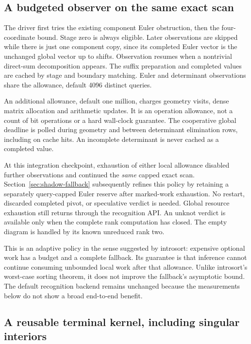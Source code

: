 \subsection{A budgeted observer on the same exact scan}

The driver first tries the existing component Euler obstruction, then
the four-coordinate bound.  Stage zero is always eligible.  Later
observations are skipped while there is just one component copy, since
its completed Euler vector is the unchanged global vector up to shifts.
Observation resumes when a nontrivial direct-sum decomposition appears.
The suffix preparation and completed values are cached by stage and
boundary matching.  Euler and determinant observations share the
 allowance, default 4096 distinct queries.

An additional  allowance, default one million,
charges geometry visits, dense matrix allocation and arithmetic updates.
It is an operation allowance, not a count of bit operations or a hard
wall-clock guarantee.  The cooperative global deadline is polled during
geometry and between determinant elimination rows, including on cache
hits.  An incomplete determinant is never cached as a completed value.

At this integration checkpoint, exhaustion of either local allowance disabled
further observations and continued the \emph{same} capped exact scan.
Section~\ref{sec:shadow-fallback} subsequently refines this policy by retaining
a separately query-capped Euler reserve after marked-work exhaustion.
No restart, discarded completed pivot, or speculative verdict is needed.
Global resource exhaustion still returns  through the
recognition API.  An unknot verdict is available only when the complete
rank computation has closed.  The empty diagram is handled by its known
unreduced rank two.

This is an adaptive policy in the sense suggested by introsort: expensive
optional work has a budget and a complete fallback.  Its guarantee is
that inference cannot continue consuming unbounded local work after
that allowance.  Unlike introsort's worst-case sorting theorem, it does
not improve the fallback's asymptotic bound.  The default recognition
backend remains unchanged because the measurements below do not show
a broad end-to-end benefit.

\subsection{A reusable terminal kernel, including singular interiors}

